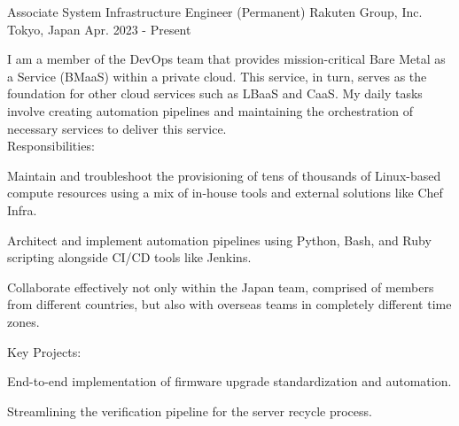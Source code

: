 

\begin{cventries}

  \cventry
    {Associate System Infrastructure Engineer (Permanent)} %
    {Rakuten Group, Inc.} %
    {Tokyo, Japan} %
    {Apr. 2023 - Present} %
    {
      \begin{cvjobdesc} %
        I am a member of the DevOps team that provides mission-critical Bare Metal as a Service (BMaaS) within a private cloud. This service, in turn, serves as the foundation for other cloud services such as LBaaS and CaaS. My daily tasks involve creating automation pipelines and maintaining the orchestration of necessary services to deliver this service.
        \vspace{2.0mm}
        \\Responsibilities:
        \begin{cvbullets}
        \item {Maintain and troubleshoot the provisioning of tens of thousands of Linux-based compute resources using a mix of in-house tools and external solutions like Chef Infra.}
        \item {Architect and implement automation pipelines using Python, Bash, and Ruby scripting alongside CI/CD tools like Jenkins.}
        \item {Collaborate effectively not only within the Japan team, comprised of members from different countries, but also with overseas teams in completely different time zones.}
        \end{cvbullets}
        \vspace{2.0mm}
        Key Projects:
        \begin{cvbullets}
        \item {End-to-end implementation of firmware upgrade standardization and automation.}
        \item {Streamlining the verification pipeline for the server recycle process.}
        \end{cvbullets}
      \end{cvjobdesc}
    }


\end{cventries}
